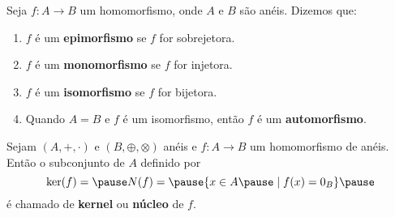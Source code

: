 \documentclass{beamer}
\begin{document}
    \begin{frame}
        \begin{definicao}Seja $f:A\rightarrow B$ um homomorfismo, onde $A$ e $B$ s{\~a}o an{\'e}is. Dizemos que:
            \begin{enumerate}[label={\roman*})]
                \item $f$ {\'e} um \textbf{epimorfismo} \pause se $f$ for sobrejetora.\pause

                \vspace{.5cm}

                \item $f$ {\'e} um \textbf{monomorfismo} \pause se $f$ for injetora.\pause

                \vspace{.5cm}

                \item $f$ {\'e} um \textbf{isomorfismo} \pause se $f$ for bijetora.\pause

                \vspace{.5cm}

                \item Quando $A=B$ \pause e $f$ {\'e} um isomorfismo, \pause ent{\~a}o $f$ {\'e} um \textbf{automorfismo}.\pause

                \vspace{.5cm}

            \end{enumerate}
        \end{definicao}
    \end{frame}

    \begin{frame}
        \begin{definicao}
            Sejam $(A, +, \cdot)$ e $(B, \oplus, \otimes)$ an\'eis \pause e $f : A \to B$ um homomorfismo de an\'eis. \pause Ent\~ao o subconjunto de $A$ \pause definido por\pause
            \[
                \ker(f) = \pause N(f) =\pause \{ x \in A \pause \mid f(x) = 0_B\}\pause
            \]
            \'e chamado de \textbf{kernel} \pause ou \textbf{n\'ucleo} \pause de $f$.\pause
        \end{definicao}
    \end{frame}
\end{document}

